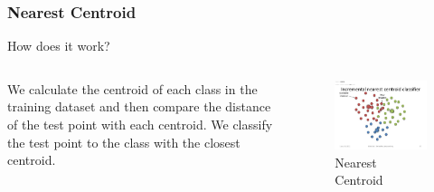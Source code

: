 \documentclass{beamer}
\begin{document}
\begin{frame}
\frametitle{Nearest Centroid}
\begin{center}
    How does it work?
\end{center}

\begin{columns}
    \begin{column}{0.5\textwidth}
        We calculate the centroid of each class in the training dataset and then compare the 
        distance of the test point with each centroid. We classify the test point to the class
        with the closest centroid.
    \end{column}

    \begin{column}{0.5\textwidth}
        \begin{figure}
            \centering
            \includegraphics[width=1\textwidth]{media/centroid_example.jpg}
            \caption{Nearest Centroid}
        \end{figure}
    \end{column}
\end{columns}

\end{frame}
\end{document}
